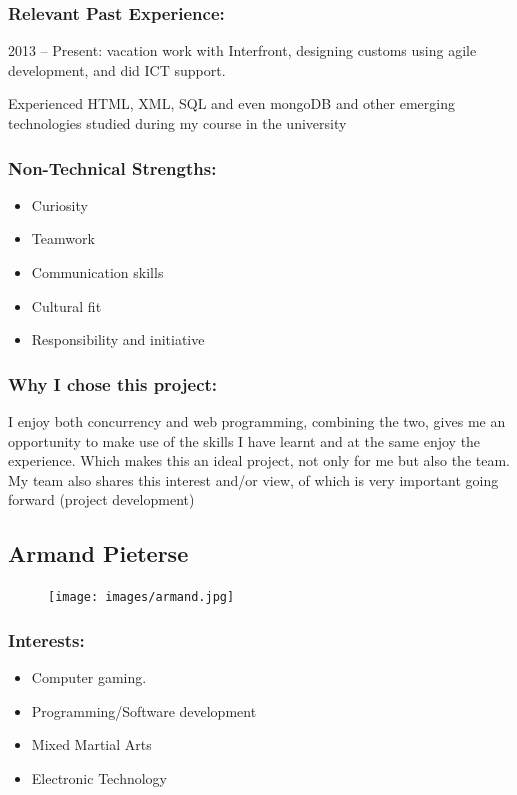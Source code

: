 \subsubsection{Relevant Past Experience:}
\par{2013 – Present: vacation work with Interfront, designing customs using agile development, and did ICT support.
}
\par{Experienced HTML, XML, SQL and even mongoDB and other emerging technologies studied during my course in the university
}
\subsubsection{Non-Technical Strengths:}
\begin{itemize}
		\item Curiosity
		\item Teamwork
		\item Communication skills
		\item Cultural fit
		\item Responsibility and initiative
	\end{itemize}
\subsubsection{Why I chose this project:}
\par{I enjoy both concurrency and web programming, combining the two, gives me an opportunity to make use of the skills I have learnt and at the same enjoy the experience. Which makes this an ideal project, not only for me but also the team. My team also shares this interest and/or view, of which is very important going forward (project development)
}

\newpage
\subsection{Armand Pieterse}
\begin{figure}[h]
			\center
			\texttt{[image: images/armand.jpg]}
\end{figure}
\subsubsection{Interests:}
	\begin{itemize}
		\item Computer gaming.
		\item Programming/Software development
		\item Mixed Martial Arts
		\item Electronic Technology
	\end{itemize}
		
